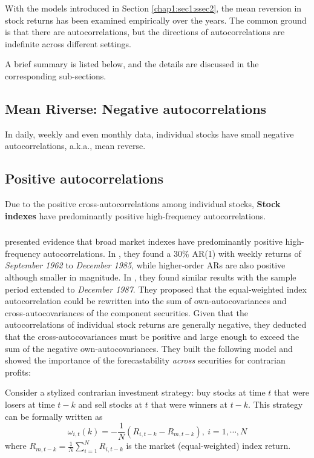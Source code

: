 With the models introduced in Section \ref{chap1:sec1:ssec2}, the mean reversion in stock returns
has been examined empirically over the years. The common ground is that there are autocorrelations,
but the directions of autocorrelations are indefinite across different settings.

A brief summary is listed below, and the details are discussed in the corresponding sub-sections.

\subsection{Mean Riverse: Negative autocorrelations}\label{chap1:sec2:ssec1}
In daily, weekly and even monthly data, individual stocks have small negative autocorrelations, a.k.a., mean reverse.

\subsection{Positive autocorrelations}\label{chap1:sec2:ssec2}
Due to the positive cross-autocorrelations among individual stocks, \textbf{Stock indexes} have predominantly
positive high-frequency autocorrelations.

\subsubsection{\citet{lo1988stock,lo1990contrarian}}\label{chap1:sec2:ssec2:paper1}
\citet{lo1988stock,lo1990contrarian} presented evidence that broad market indexes have predominantly positive
high-frequency autocorrelations. In \citeyear{lo1988stock}, they found a 30\% AR(1) with weekly returns
of \textit{September 1962} to \textit{December 1985}, while higher-order ARs are also positive although smaller in magnitude.
In \citeyear{lo1990contrarian}, they found similar results with the sample period extended to \textit{December 1987}.
They proposed that the equal-weighted index autocorrelation could be rewritten into the sum of own-autocovariances
and cross-autocovariances of the component securities. Given that the autocorrelations of individual stock returns
are generally negative, they deducted that the cross-autocovariances must be positive and large enough to exceed the sum
of the negative own-autocovariances. They built the following model and showed the importance of the forecastability 
\textit{across} securities for contrarian profits:

Consider a stylized contrarian investment strategy: buy stocks at time $t$ that were losers at time $t-k$ and sell 
stocks at $t$ that were winners at $t-k$. This strategy can be formally written as 
$$
\omega_{i,t}(k)=-\frac{1}{N}(R_{i,t-k}-R_{m,t-k}),\ i=1,\cdots,N
$$
where $R_{m,t-k}=\frac{1}{N}\sum^N_{i=1}R_{i,t-k}$ is the market (equal-weighted) index return.

